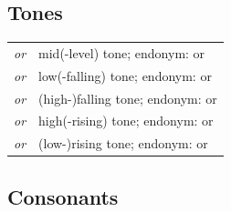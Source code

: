 \documentclass{article}
\begin{document}
\subsection{Tones}

\begin{xltabular}{\textwidth}{lL}
   \textit{or} \ipa{\={}} & mid(-level) tone; endonym:  or  \\
   \textit{or} \ipa{\`{}} & low(-falling) tone; endonym:  or  \\
   \textit{or} \ipa{\^{}} & (high-)falling tone; endonym:  or  \\
   \textit{or} \ipa{\'{}} & high(-rising) tone; endonym:  or  \\
   \textit{or} \ipa{\v{}} & (low-)rising tone; endonym:  or  \\
\end{xltabular}

\subsection{Consonants}
\end{document}

